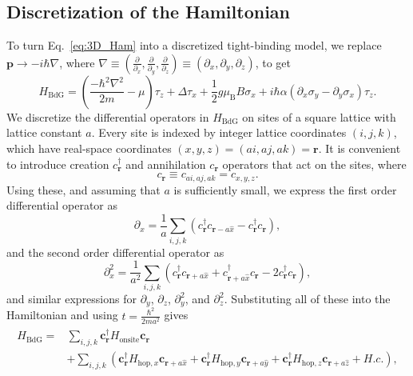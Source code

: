 \subsection{Discretization of the Hamiltonian}
To turn Eq.~\eqref{eq:3D_Ham} into a discretized tight-binding model, we replace $\bm{p} \rightarrow -i\hbar \nabla$, where $\nabla \equiv \left( \frac{\partial}{\partial_x}, \frac{\partial}{\partial_y}, \frac{\partial}{\partial_z} \right) \equiv \left( \partial_x, \partial_y, \partial_z \right)$, to get
\begin{equation}
H_{\textrm{BdG}}=\left(\frac{-\hbar^{2}\nabla^{2}}{2m}-\mu\right)\tau_{z}+\Delta\tau_{x}+\frac{1}{2}g\mu_{\textrm{B}}B\sigma_{x}+i\hbar\alpha\left(\partial_{x}\sigma_{y}-\partial_{y}\sigma_{x}\right)\tau_{z}.\label{eq:3D_Ham_again}
\end{equation}
We discretize the differential operators in $H_{\textrm{BdG}}$ on sites of a square lattice with lattice constant $a$.
Every site is indexed by integer lattice coordinates $(i,j,k)$, which have real-space coordinates $(x,y,z)=(ai,aj,ak)=\bm{r}$.
It is convenient to introduce creation $c^\dagger_{\bm{r}}$ and annihilation $c_{\bm{r}}$ operators that act on the sites, where
\begin{equation}
c_{\bm{r}} \equiv c_{ai, aj, ak} = c_{x, y, z}.
\end{equation}
Using these, and assuming that $a$ is sufficiently small, we express the first order differential operator as
\begin{equation}
\partial_{x} = \frac{1}{a}\sum_{i,j,k}\left(c^\dagger_{\bm{r}}c_{\bm{r}-a\hat{x}}-c^\dagger_{\bm{r}}c_{\bm{r}}\right),
\end{equation}
and the second order differential operator as
\begin{equation}
\partial_{x}^{2} = \frac{1}{a^{2}}\sum_{i,j,k}\left( c^\dagger_{\bm{r}}c_{\bm{r}+a\hat{x}}+c^\dagger_{\bm{r}+a\hat{x}}c_{\bm{r}}-2c^\dagger_{\bm{r}}c_{\bm{r}}\right),
\end{equation}
and similar expressions for $\partial_{y}$, $\partial_{z}$, $\partial_{y}^2$, and $\partial_{z}^2$.
Substituting all of these into the Hamiltonian and using $t = \frac{\hbar^2}{2 m a^2}$ gives
\begin{align}
\begin{aligned}
H_{\textrm{BdG}}= & \sum_{i,j,k}\bm{c}_{\bm{r}}^{\dagger}H_{\textrm{onsite}}\bm{c}_{\bm{r}} \\
                  & +\sum_{i,j,k}\left(\bm{c}_{\bm{r}}^{\dagger}H_{\textrm{hop},x}\bm{c}_{\bm{r}+a\hat{x}}+\bm{c}_{\bm{r}}^{\dagger}H_{\textrm{hop},y}\bm{c}_{\bm{r}+a\hat{y}}+\bm{c}_{\bm{r}}^{\dagger}H_{\textrm{hop},z}\bm{c}_{\bm{r}+a\hat{z}}+H.c.\right),
\end{aligned}
\end{align}
